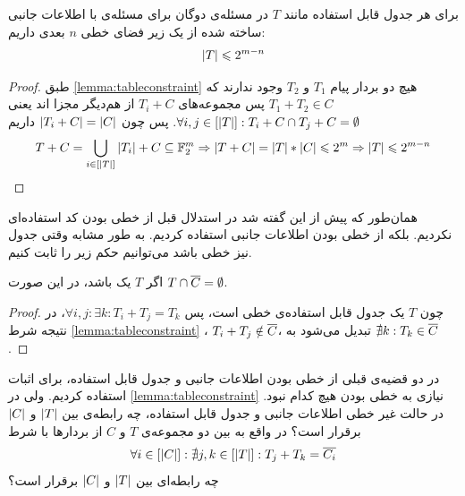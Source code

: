 \begin{theorem}
	\label{thm:our:hardexample}
	برای هر  جدول قابل استفاده
	مانند
	$T$
	 در مسئله‌ی دوگان برای مسئله‌ی
	\picod
	با اطلاعات جانبی ساخته شده از یک زیر فضای خطی
	$n$
	بعدی داریم:
	\begin{align*}
		\left|{T}\right| \leqslant 2^{m - n}
	\end{align*}
\end{theorem}
\begin{proof}
	طبق
	\autoref{lemma:tableconstraint}
	هیچ دو بردار پیام
	$T_1$
	و
	$T_2$
	وجود ندارند که
	$T_1 + T_2 \in C$
	پس مجموعه‌های
	$T_i + C$
	از هم‌دیگر مجزا اند یعنی
	$\forall i, j \in [\left|{T}\right|]: T_i + C \cap T_j + C = \emptyset$.
 پس چون
	$\left|{T_i + C}\right| = \left|{C}\right|$
	داریم
	\begin{align}
	T + C =  \bigcup_{i \in [\left|{T}\right|]} \left|{T_i}\right| + C \subseteq \mathbb{F}_2^m \Rightarrow \left|{T + C}\right| = \left|{T }\right| * \left|{C}\right| \leqslant 2^m \Rightarrow \left|{T}\right| \leqslant 2^{m - n}
		\end{align}
\end{proof}

همان‌طور که پیش از این گفته شد در استدلال قبل از خطی بودن کد استفاده‌ای نکردیم. بلکه از خطی بودن اطلاعات جانبی استفاده کردیم. به طور مشابه وقتی جدول نیز خطی باشد می‌توانیم حکم زیر را ثابت کنیم.
\begin{theorem}
	اگر 
	$T$
	یک 
	باشد، در این صورت
	$T \cap \overline{C} = \emptyset$.
\end{theorem}
\begin{proof}
	چون
	$T$
	یک جدول قابل استفاده‌ی خطی است، پس
	$\forall i, j: \exists k: T_i + T_j = T_k$،
	در نتیجه شرط
	\autoref{lemma:tableconstraint}
	،
	$T_i + T_j \notin \overline{C}$،
	تبدیل می‌شود به
	$\nexists k: T_k \in \overline{C}$.
\end{proof}

\begin{questionn}
	در دو قضیه‌ی قبلی از خطی بودن اطلاعات جانبی و جدول قابل استفاده، برای اثبات استفاده کردیم. ولی در
	\autoref{lemma:tableconstraint}
	نیازی به خطی بودن هیچ کدام نبود. در حالت غیر خطی اطلاعات جانبی و جدول قابل استفاده، چه رابطه‌ی بین
	$\left|{T}\right|$
	و
	$\left|{C}\right|$
	برقرار است؟ در واقع به بین دو مجموعه‌ی
	$T$
	و
	$C$
	 از بردارها با شرط
 	\begin{align}
	 	\forall i \in [\left|{C}\right|]: \nexists j, k \in [\left|{T}\right|]: T_j + T_k = \overline{C_i}
	 \end{align}
	 چه رابطه‌ای بین
	 	$\left|{T}\right|$
	 و
	 $\left|{C}\right|$
	 برقرار است؟
\end{questionn}

